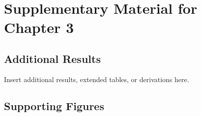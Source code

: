 \chapter{Supplementary Material for Chapter 3}
\label{app:chap3}

\section{Additional Results}
Insert additional results, extended tables, or derivations here.

\section{Supporting Figures}
